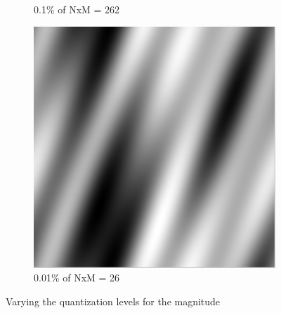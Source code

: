 \documentclass[a4paper, 10pt, conference] {article}
\begin{document}
\begin{figure}[H]
\begin{subfigure}{0.32\textwidth}
  		\caption{0.1\% of NxM = 262}
  	\end{subfigure}
  	\begin{subfigure}{0.32\textwidth}
  		\centering
  		\includegraphics[scale=0.33]{reportImages/exp3_mag00001.PNG}
  		\caption{0.01\% of NxM = 26}
  	\end{subfigure}
  	\caption{Varying the quantization levels for the magnitude}
  	\label{exp3_mag_1}
  \end{figure}
   
\end{document}
